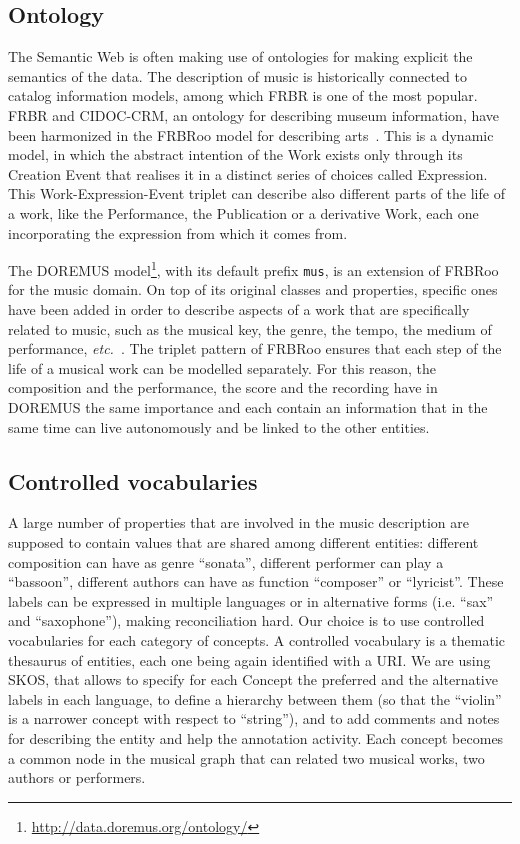 \documentclass{article}
\begin{document}
\subsection{Ontology}\label{subsec:onto}
The Semantic Web is often making use of ontologies for making explicit the semantics of the data. The description of music is historically connected to catalog information models, among which FRBR is one of the most popular. FRBR and CIDOC-CRM, an ontology for describing museum information, have been harmonized in the FRBRoo model for describing arts~\cite{doerr2008frbroo}. This is a dynamic model, in which the abstract intention of the Work exists only through its Creation Event that realises it in a distinct series of choices called Expression. This Work-Expression-Event triplet can describe also different parts of the life of a work, like the Performance, the Publication or a derivative Work, each one incorporating the expression from which it comes from.

The DOREMUS model\footnote{\url{http://data.doremus.org/ontology/}}, with its default prefix \texttt{mus}, is an extension of FRBRoo for the music domain. On top of its original classes and properties, specific ones have been added in order to describe aspects of a work that are specifically related to music, such as the musical key, the genre, the tempo, the medium of performance, {\it etc.}~\cite{choffe2016doremus}. The triplet pattern of FRBRoo ensures that each step of the life of a musical work can be modelled separately. For this reason, the composition and the performance, the score and the recording have in DOREMUS the same importance and each contain an information that in the same time can live autonomously and be linked to the other entities.

\subsection{Controlled vocabularies}
A large number of properties that are involved in the music description are supposed to contain values that are shared among different entities: different composition can have as genre ``sonata'', different performer can play a ``bassoon'', different authors can have as function ``composer'' or ``lyricist''. These labels can be expressed in multiple languages or in alternative forms (i.e. ``sax'' and ``saxophone''), making reconciliation hard. Our choice is to use controlled vocabularies for each category of concepts. A controlled vocabulary is a thematic thesaurus of entities, each one being again identified with a URI. We are using SKOS, that allows to specify for each Concept the preferred and the alternative labels in each language, to define a hierarchy between them (so that the ``violin'' is a narrower concept with respect to ``string''), and to add comments and notes for describing the entity and help the annotation activity. Each concept becomes a common node in the musical graph that can related two musical works, two authors or performers.
\end{document}
